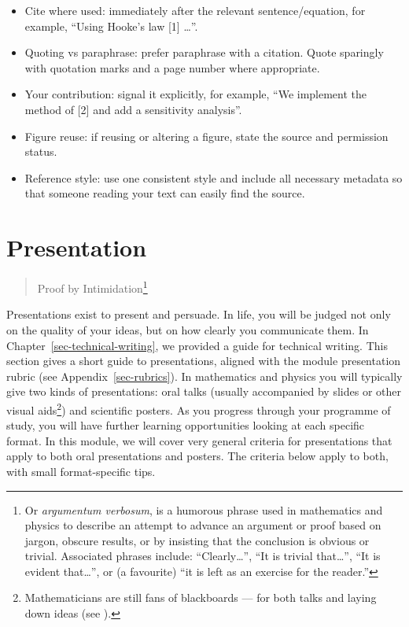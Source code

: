 \documentclass[
  a4paper,
  DIV=11,
  numbers=noendperiod,
  oneside]{scrreprt}
\providecommand{\tightlist}{%
  \setlength{\itemsep}{0pt}\setlength{\parskip}{0pt}}
\begin{document}
\begin{itemize}
\tightlist
\item
  Cite where used: immediately after the relevant sentence/equation, for
  example, ``Using Hooke's law {[}1{]} \ldots{}''.
\item
  Quoting vs paraphrase: prefer paraphrase with a citation. Quote
  sparingly with quotation marks and a page number where appropriate.
\item
  Your contribution: signal it explicitly, for example, ``We implement
  the method of {[}2{]} and add a sensitivity analysis''.
\item
  Figure reuse: if reusing or altering a figure, state the source and
  permission status.
\item
  Reference style: use one consistent style and include all necessary
  metadata so that someone reading your text can easily find the source.
\end{itemize}

\chapter{Presentation}\label{sec-presentation}

\begin{quote}
Proof by Intimidation\footnote{Or \emph{argumentum verbosum}, is a
  humorous phrase used in mathematics and physics to describe an attempt
  to advance an argument or proof based on jargon, obscure results, or
  by insisting that the conclusion is obvious or trivial. Associated
  phrases include: ``Clearly\ldots{}'', ``It is trivial that\ldots{}'',
  ``It is evident that\ldots{}'', or (a favourite) ``it is left as an
  exercise for the reader.''}
\end{quote}

Presentations exist to present and persuade. In life, you will be judged
not only on the quality of your ideas, but on how clearly you
communicate them. In Chapter~\ref{sec-technical-writing}, we provided a
guide for technical writing. This section gives a short guide to
presentations, aligned with the module presentation rubric (see
Appendix~\ref{sec-rubrics}). In mathematics and physics you will
typically give two kinds of presentations: oral talks (usually
accompanied by slides or other visual aids\footnote{Mathematicians are
  still fans of blackboards --- for both talks and laying down ideas
  (see ).}) and scientific
posters. As you progress through your programme of study, you will have
further learning opportunities looking at each specific format. In this
module, we will cover very general criteria for presentations that apply
to both oral presentations and posters. The criteria below apply to
both, with small format-specific tips.
\end{document}
